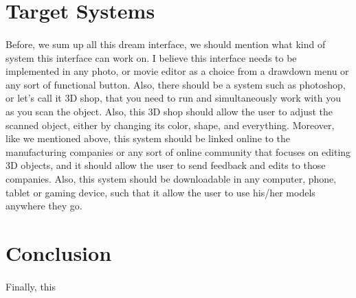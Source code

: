 \documentclass[12pt, oneside]{article}   	%
\begin{document}
\section{Target Systems}
\paragraph{}
Before, we sum up all this dream interface, we should mention what kind of system this interface can work on.  I believe this interface needs to be implemented in any photo, or movie editor as a choice from a drawdown menu or any sort of functional button.  Also, there should be a system such as photoshop, or let's call it 3D shop, that you need to run and simultaneously work with you as you scan the object.  Also, this 3D shop should allow the user to adjust the scanned object, either by changing its color, shape, and everything. Moreover, like we mentioned above, this system should be linked online to the manufacturing companies or any sort of online community that focuses on editing 3D objects, and it should allow the user to send feedback and edits to those companies.  Also, this system should be downloadable in any computer, phone, tablet or gaming device, such that it allow the user to use his/her models anywhere they go. 
\section{Conclusion}
\paragraph{}
Finally, this 
\end{document}
